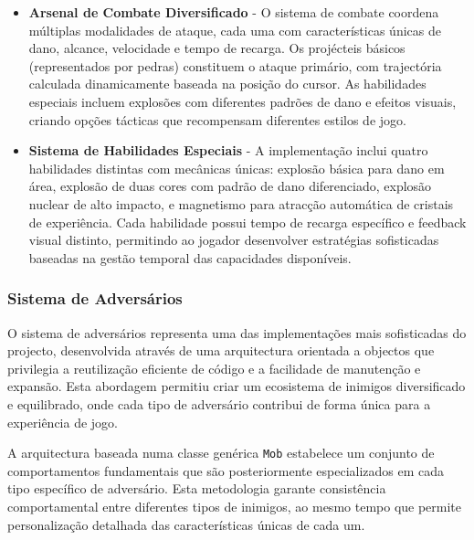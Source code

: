 \begin{itemize}
  \item \textbf{Arsenal de Combate Diversificado} - O sistema de combate coordena múltiplas modalidades de ataque, cada uma com características únicas de dano, alcance, velocidade e tempo de recarga. Os projécteis básicos (representados por pedras) constituem o ataque primário, com trajectória calculada dinamicamente baseada na posição do cursor. As habilidades especiais incluem explosões com diferentes padrões de dano e efeitos visuais, criando opções tácticas que recompensam diferentes estilos de jogo.
  
  \item \textbf{Sistema de Habilidades Especiais} - A implementação inclui quatro habilidades distintas com mecânicas únicas: explosão básica para dano em área, explosão de duas cores com padrão de dano diferenciado, explosão nuclear de alto impacto, e magnetismo para atracção automática de cristais de experiência. Cada habilidade possui tempo de recarga específico e feedback visual distinto, permitindo ao jogador desenvolver estratégias sofisticadas baseadas na gestão temporal das capacidades disponíveis.
\end{itemize}

\subsubsection{Sistema de Adversários}
\hspace{2em} O sistema de adversários representa uma das implementações mais sofisticadas do projecto, desenvolvida através de uma arquitectura orientada a objectos que privilegia a reutilização eficiente de código e a facilidade de manutenção e expansão. Esta abordagem permitiu criar um ecosistema de inimigos diversificado e equilibrado, onde cada tipo de adversário contribui de forma única para a experiência de jogo.

\hspace{2em} A arquitectura baseada numa classe genérica \texttt{Mob} estabelece um conjunto de comportamentos fundamentais que são posteriormente especializados em cada tipo específico de adversário. Esta metodologia garante consistência comportamental entre diferentes tipos de inimigos, ao mesmo tempo que permite personalização detalhada das características únicas de cada um.

